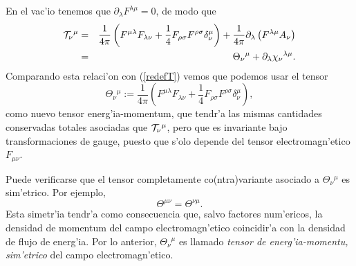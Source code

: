 En el vac'io tenemos que $\partial_{\lambda}F^{\lambda\mu}=0$, de modo que
\begin{eqnarray}
{\cal T}_\nu{}^\mu  &=&\frac{1}{4\pi}\left(
F^{\mu\lambda}F_{\lambda\nu}+\frac{1}%
{4}F_{\rho\sigma}F^{\rho\sigma}\delta_{\nu}^\mu \right)  +\frac{1}{4\pi
}\partial_{\lambda}\left(  F^{\lambda\mu}A_{\nu}\right) \\
&=& \Theta_\nu{}^\mu +\partial_\lambda\chi_\nu{}^{\lambda\mu} .
\end{eqnarray}
Comparando esta relaci'on con (\ref{redefT}) vemos que podemos usar el tensor
\begin{equation}
\boxed{\Theta_\nu{}^\mu :=\frac{1}{4\pi}\left(  F^{\mu\lambda}F_{\lambda\nu}+\frac{1}%
{4}F_{\rho\sigma}F^{\rho\sigma}\delta_{\nu}^\mu \right),}  \label{temsim}
\end{equation}
 como nuevo tensor energ'ia-momentum, que tendr'a las mismas cantidades
conservadas totales asociadas que ${\cal T}_\nu{}^\mu $, pero que es invariante
bajo transformaciones de gauge, puesto que s'olo depende del tensor
electromagn'etico $F_{\mu\nu}$.

 Puede verificarse que el tensor completamente co(ntra)variante asociado a
$\Theta_\nu{}^\mu $ es sim'etrico. Por ejemplo,
\begin{equation}
\Theta^{\mu\nu}=\Theta^{\nu\mu}.
\end{equation}
Esta simetr'ia tendr'a como consecuencia que, salvo factores num'ericos, la
densidad de momentum del campo electromagn'etico coincidir'a con la densidad de
flujo de energ'ia. Por lo anterior, $\Theta_\nu{}^\mu $ es llamado \textit{tensor de energ'ia-momentu, sim'etrico} del campo electromagn'etico.

